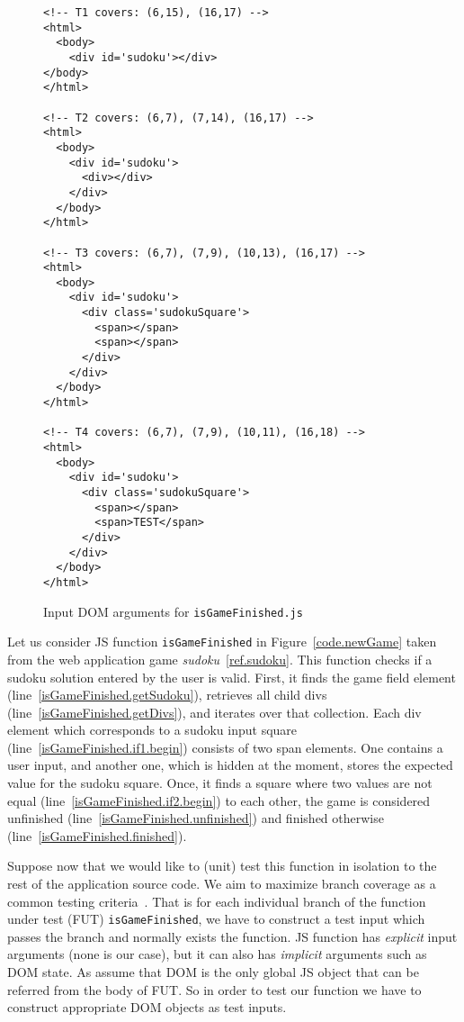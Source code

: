 \documentclass[sigconf]{acmart}
\begin{document}
\begin{figure}[t]
  \begin{lstlisting}[style=htmlcssjs, language=HTML5]
<!-- T1 covers: (6,15), (16,17) -->
<html>
  <body>
    <div id='sudoku'></div>
</body>
</html>

<!-- T2 covers: (6,7), (7,14), (16,17) -->
<html>
  <body>
    <div id='sudoku'>
      <div></div>
    </div>
  </body>
</html>

<!-- T3 covers: (6,7), (7,9), (10,13), (16,17) -->
<html>
  <body>
    <div id='sudoku'>
      <div class='sudokuSquare'>
        <span></span>
        <span></span>
      </div>
    </div>
  </body>
</html>

<!-- T4 covers: (6,7), (7,9), (10,11), (16,18) -->
<html>
  <body>
    <div id='sudoku'>
      <div class='sudokuSquare'>
        <span></span>
        <span>TEST</span>
      </div>
    </div>
  </body>
</html>
  \end{lstlisting}
  \caption{Input DOM arguments for \texttt{isGameFinished.js}}
  \label{fig.isGameFinished.tests}
\end{figure}

Let us consider JS function \texttt{isGameFinished} in Figure~\ref{code.newGame} taken from the web application game \emph{sudoku}~\ref{ref.sudoku}. This function checks if a sudoku solution entered by the user is valid. First, it finds the game field element (line~\ref{isGameFinished.getSudoku}), retrieves all child divs (line~\ref{isGameFinished.getDivs}), and iterates over that collection. Each div element which corresponds to a sudoku input square (line~\ref{isGameFinished.if1.begin}) consists of two span elements. One contains a user input, and another one, which is hidden at the moment, stores the expected value for the sudoku square. Once, it finds a square where two values are not equal (line~\ref{isGameFinished.if2.begin}) to each other, the game is considered unfinished (line~\ref{isGameFinished.unfinished}) and finished otherwise (line~\ref{isGameFinished.finished}).

Suppose now that we would like to (unit) test this function in isolation to the rest of the application source code. We aim to maximize branch coverage as a common testing criteria~\cite{why_is_common}. That is for each individual branch of the function under test (FUT) \texttt{isGameFinished}, we have to construct a test input which passes the branch and normally exists the function. JS function has \emph{explicit} input arguments (none is our case), but it can also has \emph{implicit} arguments such as DOM state. As assume that DOM is the only global JS object that can be referred from the body of FUT. So in order to test our function we have to construct appropriate DOM objects as test inputs.   
\end{document}
